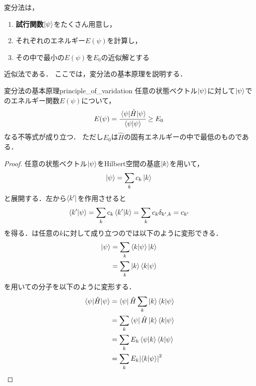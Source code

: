 \documentclass{report}
\begin{document}
  変分法は，
  \begin{screen}
    \begin{enumerate}
      \item \textbf{試行関数}$\ket{\psi}$をたくさん用意し，
      \item それぞれのエネルギー$E(\psi)$を計算し，
      \item その中で最小の$E(\psi)$を$E_0$の近似解とする
    \end{enumerate}
  \end{screen}
  近似法である．
  ここでは，変分法の基本原理を説明する．
  \begin{myprop}{変分法の基本原理}{principle_of_varidation}
    任意の状態ベクトル$\ket{\psi}$に対して$\ket{\psi}$でのエネルギー関数$E(\psi)$について，
    \begin{align}
      E(\psi) = \cfrac{\mel{\psi}{\hat{H}}{\psi}}{\braket{\psi}} \geq E_0 \label{minimum}
    \end{align}
    なる不等式が成り立つ．
    ただし$E_0$は$\hat{H}$の固有エネルギーの中で最低のものである．
    \tcblower
    \begin{proof}
      任意の状態ベクトル$\ket{\psi}$をHilbert空間の基底$\ket{k}$を用いて，
      \begin{align}
        \ket{\psi} = \sum_{k} c_k\ket{k} \label{basis_expansion}
      \end{align}
      と展開する．左から$\bra{k'}$を作用させると
      \begin{align}
        \braket{k'}{\psi} = \sum_{k}c_k\bra{k'}\ket{k} = \sum_{k}c_k\delta_{k',k} = c_{k'} \label{basis_expansion2}
      \end{align}
      を得る．は任意の$k$に対して成り立つのでは以下のように変形できる．
      \begin{align}
        \ket{\psi} &= \sum_{k}\braket{k}{\psi}\ket{k}\\
        &= \sum_{k}\ket{k}\bra{k}\ket{\psi} \label{basis_expansion3}
      \end{align}
      を用いての分子を以下のように変形する．
      \begin{align}
        \mel{\psi}{\hat{H}}{{\psi}} &= \bra{\psi}\hat{H}\sum_{k}\ket{k}\braket{k}{\psi}\\
        &= \sum_{k}\bra{\psi}\hat{H}\ket{k}\braket{k}{\psi} \\
        &= \sum_{k}E_k\bra{\psi}\ket{k}\braket{k}{\psi} \\
        &= \sum_{k}E_k\abs{\braket{k}{\psi}}^2

\end{align}
\end{proof}
\end{myprop}
\end{document}
